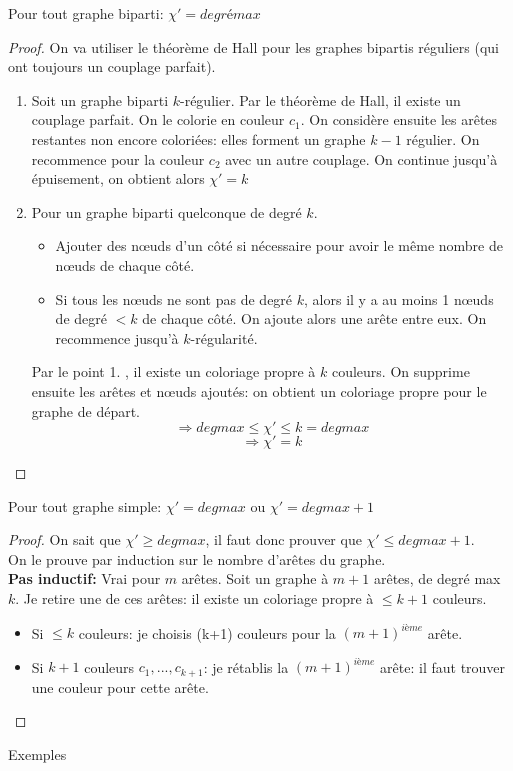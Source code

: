 \begin{mytheo}[König]
  Pour tout graphe biparti: $\chi '= degré max$
  \begin{proof}
    On va utiliser le théorème de Hall pour les graphes bipartis réguliers (qui ont toujours un couplage parfait).
    \begin{enumerate}


    \item Soit un graphe biparti $k$-régulier. Par le théorème de Hall, il existe un couplage parfait. On le colorie en couleur $c_{1}$. On considère ensuite les arêtes restantes non encore coloriées: elles forment un graphe $k-1$ régulier. On recommence pour la couleur $c_{2}$ avec un autre couplage. On continue jusqu'à épuisement, on obtient alors $\chi '=k$
    \item Pour un graphe biparti quelconque de degré $k$.
    \begin{itemize}
    \item Ajouter des nœuds d'un côté si nécessaire pour avoir le même nombre de nœuds de chaque côté.
    \item Si tous les nœuds ne sont pas de degré $k$, alors il y a au moins 1 nœuds de degré $<k$ de chaque côté. On ajoute alors une arête entre eux. On recommence jusqu'à $k$-régularité.
    \end{itemize}
    Par le point 1. , il existe un coloriage propre à $k$ couleurs. On supprime ensuite les arêtes et nœuds ajoutés: on obtient un coloriage propre pour le graphe de départ.
    $$\Rightarrow deg max \le \chi ' \le k=deg max$$
    $$\Rightarrow \chi ' = k$$
    \end{enumerate}
  \end{proof}
\end{mytheo}

\begin{mytheo} [Vizing]
Pour tout graphe simple: $\chi ' = deg max$ ou  $\chi ' = deg max + 1$
  \begin{proof} On sait que $\chi' \ge deg max$, il faut donc prouver que $\chi ' \le deg max + 1$.
  \\On le prouve par induction sur le nombre d'arêtes du graphe.
  \\ \textbf{Pas inductif:} Vrai pour $m$ arêtes. Soit un graphe à  $m+1$ arêtes, de degré max $k$. Je retire une de ces arêtes: il existe un coloriage propre à $\le k+1$ couleurs.
  \begin{itemize}
  \item Si $\le k$ couleurs: je choisis (k+1) couleurs pour la $(m+1)^{ième}$ arête.
  \item Si $k+1$ couleurs $c_{1},...,c_{k+1}$: je rétablis la $(m+1)^{ième}$ arête: il faut trouver une couleur pour cette arête.
  \end{itemize}

  \end{proof}
\end{mytheo}
\begin{myexem}
  Exemples
\end{myexem}
